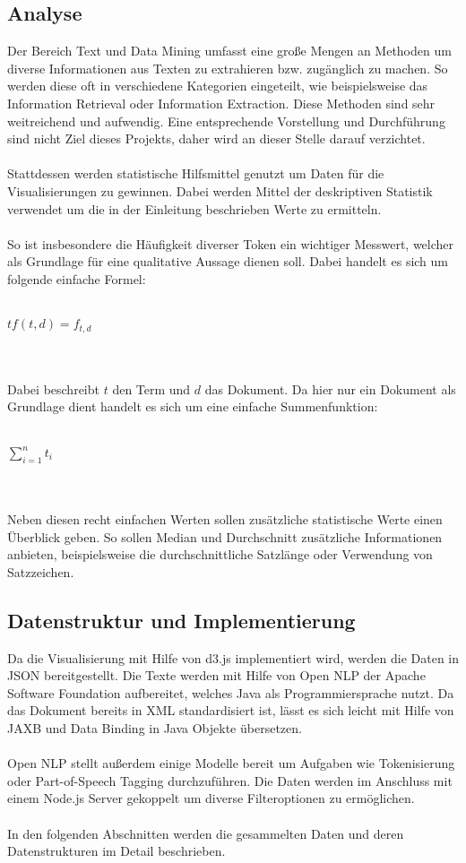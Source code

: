 \subsection{Analyse}
Der Bereich Text und Data Mining umfasst eine große Mengen an Methoden um diverse Informationen aus Texten zu extrahieren bzw. zug\"anglich zu machen. So werden diese oft in verschiedene Kategorien eingeteilt, wie beispielsweise das Information Retrieval oder Information Extraction. Diese Methoden sind sehr weitreichend und aufwendig. Eine entsprechende Vorstellung und Durchf\"uhrung sind nicht Ziel dieses Projekts, daher wird an dieser Stelle darauf verzichtet.\\
\\
Stattdessen werden statistische Hilfsmittel genutzt um Daten f\"ur die Visualisierungen zu gewinnen. Dabei werden Mittel der deskriptiven Statistik verwendet um die in der Einleitung beschrieben Werte zu ermitteln.\\
\\
So ist insbesondere die Häufigkeit diverser Token ein wichtiger Messwert, welcher als Grundlage f\"ur eine qualitative Aussage dienen soll. Dabei handelt es sich um folgende einfache Formel:\\
\\
\centerline{$ tf(t,d) = f_{t,d} $}\\
\\
Dabei beschreibt $t$ den Term und $d$ das Dokument. Da hier nur ein Dokument als Grundlage dient handelt es sich um eine einfache Summenfunktion:\\
\\
\centerline{$\sum_{i=1}^{n} t_i$}\\
\\
Neben diesen recht einfachen Werten sollen zus\"atzliche statistische Werte einen \"Uberblick geben. So sollen Median und Durchschnitt zus\"atzliche Informationen anbieten, beispielsweise die durchschnittliche Satzl\"ange oder Verwendung von Satzzeichen.

\subsection{Datenstruktur und Implementierung}
Da die Visualisierung mit Hilfe von d3.js implementiert wird, werden die Daten in JSON bereitgestellt. Die Texte werden mit Hilfe von Open NLP der Apache Software Foundation aufbereitet, welches Java als Programmiersprache nutzt. Da das Dokument bereits in XML standardisiert ist, l\"asst es sich leicht mit Hilfe von JAXB und Data Binding in Java Objekte \"ubersetzen. \\
\\
Open NLP stellt außerdem einige Modelle bereit um Aufgaben wie Tokenisierung oder Part-of-Speech Tagging durchzuf\"uhren. Die Daten werden im Anschluss mit einem Node.js Server gekoppelt um diverse Filteroptionen zu erm\"oglichen.\\
\\
In den folgenden Abschnitten werden die gesammelten Daten und deren Datenstrukturen im Detail beschrieben.

